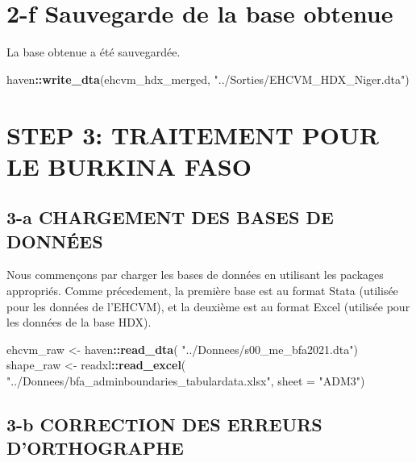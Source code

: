 \documentclass[
]{article}
\newenvironment{Shaded}{\begin{snugshade}}{\end{snugshade}}
\newcommand{\AttributeTok}[1]{\textcolor[rgb]{0.13,0.29,0.53}{#1}}
\newcommand{\FunctionTok}[1]{\textcolor[rgb]{0.13,0.29,0.53}{\textbf{#1}}}
\newcommand{\NormalTok}[1]{#1}
\newcommand{\OtherTok}[1]{\textcolor[rgb]{0.56,0.35,0.01}{#1}}
\newcommand{\SpecialCharTok}[1]{\textcolor[rgb]{0.81,0.36,0.00}{\textbf{#1}}}
\newcommand{\StringTok}[1]{\textcolor[rgb]{0.31,0.60,0.02}{#1}}
\begin{document}
\section{2-f Sauvegarde de la base
obtenue}\label{f-sauvegarde-de-la-base-obtenue}

La base obtenue a été sauvegardée.

\begin{Shaded}
\begin{Highlighting}[]
\NormalTok{haven}\SpecialCharTok{::}\FunctionTok{write\_dta}\NormalTok{(ehcvm\_hdx\_merged, }\StringTok{"../Sorties/EHCVM\_HDX\_Niger.dta"}\NormalTok{)}
\end{Highlighting}
\end{Shaded}

\newpage
{}
\section*{\centering \Huge  STEP 3: TRAITEMENT POUR LE BURKINA FASO}

\subsection{3-a CHARGEMENT DES BASES DE
DONNÉES}\label{a-chargement-des-bases-de-donnuxe9es-1}

Nous commençons par charger les bases de données en utilisant les
packages appropriés. Comme précedement, la première base est au format
Stata (utilisée pour les données de l'EHCVM), et la deuxième est au
format Excel (utilisée pour les données de la base HDX).

\begin{Shaded}
\begin{Highlighting}[]
\NormalTok{ehcvm\_raw }\OtherTok{\textless{}{-}}\NormalTok{ haven}\SpecialCharTok{::}\FunctionTok{read\_dta}\NormalTok{(}
  \StringTok{"../Donnees/s00\_me\_bfa2021.dta"}\NormalTok{)}
\NormalTok{shape\_raw }\OtherTok{\textless{}{-}}\NormalTok{ readxl}\SpecialCharTok{::}\FunctionTok{read\_excel}\NormalTok{(}
  \StringTok{"../Donnees/bfa\_adminboundaries\_tabulardata.xlsx"}\NormalTok{, }
  \AttributeTok{sheet =} \StringTok{"ADM3"}\NormalTok{)}
\end{Highlighting}
\end{Shaded}

\subsection{3-b CORRECTION DES ERREURS
D'ORTHOGRAPHE}\label{b-correction-des-erreurs-dorthographe}
\end{document}
